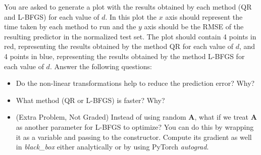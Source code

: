 \documentclass{harvardml}
\begin{document}
\begin{problem}[14pts]
You are asked to generate a plot
with the results obtained by each method (QR and L-BFGS)
for each value of $d$. In this plot
the $x$ axis should represent the time taken by each method to
run and the $y$ axis should be the RMSE of the resulting predictor in the
normalized test set. The plot should
contain 4 points in red, representing the results obtained by the method QR for
each value of $d$, and 4 points in blue, representing the results obtained
by the method L-BFGS for each value of $d$. Answer the following questions:
\begin{itemize}
\item Do the non-linear transformations help to reduce the prediction error? Why?
\item What method (QR or L-BFGS) is faster? Why?
\item (Extra Problem, Not Graded) Instead of using random $\mathbf{A}$, what if we treat
  $\mathbf{A}$ as another parameter for L-BFGS to optimize? You can do
  this by wrapping it as a variable and passing to the
  constructor. Compute its gradient as well in \textit{black\_box}
  either analytically or by using PyTorch \textit{autograd}.


\end{itemize}
\vspace{0.1cm}
\end{problem}
\end{document}
